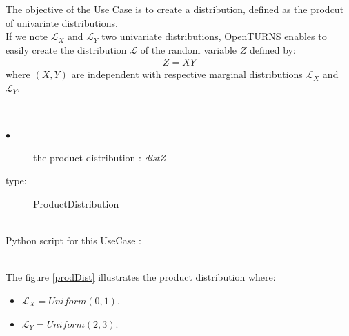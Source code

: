 \renewcommand{\filename}{docUC_InputNoData_ProductDistribution.tex}
\renewcommand{\filetitle}{UC : Creation  of 1D distribution as the product of 1D distributions}

\HeaderIIILevel


The objective of the Use Case is to create a distribution, defined as the prodcut of univariate distributions.\\

If we note $\mathcal{L}_X$ and $\mathcal{L}_Y$ two univariate distributions, OpenTURNS enables to easily create the distribution  $\mathcal{L}$ of the random variable $Z$ defined by:
\begin{align}
  Z=XY
\end{align}
where $(X,Y)$ are independent with respective marginal distributions  $\mathcal{L}_X$ and $\mathcal{L}_Y$.

\textspace\\

\noindent%
{
  \begin{description}
  \item[$\bullet$] the product distribution : {\itshape distZ}
  \item[type:] ProductDistribution
  \end{description}
}

\textspace\\
Python script for this UseCase :


\textspace\\

The figure \ref{prodDist} illustrates the product distribution where:
\begin{itemize}
\item  $\mathcal{L}_X = Uniform(0, 1)$,
\item  $\mathcal{L}_Y = Uniform(2, 3)$.
\end{itemize}




